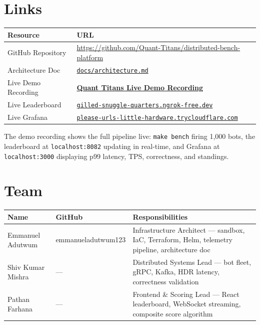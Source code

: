 \documentclass[12pt,a4paper]{article}
\begin{document}
\section{Links}
\label{sec:demo}

\begin{center}
\begin{tabular}{L{4.5cm} L{9cm}}
  \toprule
  \textbf{Resource} & \textbf{URL} \\
  \midrule
  GitHub Repository    & \url{https://github.com/Quant-Titans/distributed-bench-platform} \\
  Architecture Doc     & \href{https://github.com/Quant-Titans/distributed-bench-platform/blob/main/docs/architecture.md}{\texttt{docs/architecture.md}} \\
  Live Demo Recording  & \href{https://drive.google.com/file/d/1E9xaJxHHFGDKy_20ZCiWIMj6p_5RHUQ6/view?usp=sharing}{\textbf{Quant Titans Live Demo Recording}} \\
  Live Leaderboard     & \href{https://gilled-snuggle-quarters.ngrok-free.dev}{\texttt{gilled-snuggle-quarters.ngrok-free.dev}} \\
  Live Grafana         & \href{https://please-urls-little-hardware.trycloudflare.com}{\texttt{please-urls-little-hardware.trycloudflare.com}} \\
  \bottomrule
\end{tabular}
\end{center}

\vspace{0.5em}
\begin{infobox}
The demo recording shows the full pipeline live: \texttt{make bench} firing 1{,}000 bots,
the leaderboard at \texttt{localhost:8082} updating in real-time, and Grafana at
\texttt{localhost:3000} displaying p99 latency, TPS, correctness, and standings.
\end{infobox}

\section{Team}

\begin{center}
\begin{tabular}{L{4cm} L{4cm} L{6cm}}
  \toprule
  \textbf{Name} & \textbf{GitHub} & \textbf{Responsibilities} \\
  \midrule
  Emmanuel Adutwum  & emmanueladutwum123 & Infrastructure Architect — sandbox, IaC, Terraform, Helm, telemetry pipeline, architecture doc \\[6pt]
  Shiv Kumar Mishra & —                 & Distributed Systems Lead — bot fleet, gRPC, Kafka, HDR latency, correctness validation \\[6pt]
  Pathan Farhana    & —                 & Frontend \& Scoring Lead — React leaderboard, WebSocket streaming, composite score algorithm \\
  \bottomrule
\end{tabular}
\end{center}
\end{document}
